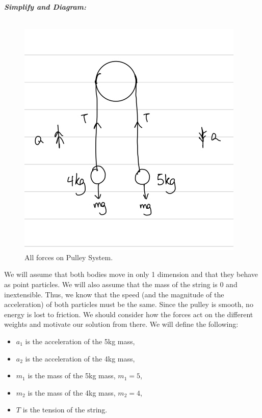 \begin{subquestions}
\begin{subsubquestions}
	
	\textbf{\textit{Simplify and Diagram:}} \\ \\
	\begin{figure}[H]
		\begin{center}
			\includegraphics[scale=0.25]{../2011/figures/2011q5-2}
			\caption{\label{2011:q5:Diagram2} All forces on Pulley System.}
		\end{center}
	\end{figure}
	We will assume that both bodies move in only 1 dimension and that they behave as point particles. We will also assume that the mass of the string is 0 and inextensible. Thus, we know that the speed (and the magnitude of the acceleration) of both particles must be the same. Since the pulley is smooth, no energy is lost to friction. We should consider how the forces act on the different weights and motivate our solution from there.
	We will define the following:
	\begin{itemize}
		\item $a_1$ is the acceleration of the 5kg mass,
		\item $a_2$ is the acceleration of the 4kg mass,
		\item $m_1$ is the mass of the 5kg mass, $m_1=5$,
		\item $m_2$ is the mass of the 4kg mass, $m_2=4$,
		\item $T$ is the tension of the string.
	\end{itemize}
	

\end{subsubquestions}
\end{subquestions}
